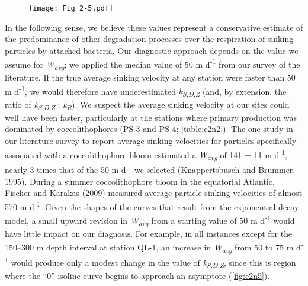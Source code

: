 \begin{figure}[!p]
\texttt{[image: Fig\_2-5.pdf]}
\end{figure}

In the following sense, we believe these values represent a conservative estimate of the predominance of other degradation processes over the respiration of sinking particles by attached bacteria. Our diagnostic approach depends on the value we assume for \emph{W\textsubscript{avg}}; we applied the median value of 50 m d\textsuperscript{-1} from our survey of the literature. If the true average sinking velocity at any station were faster than 50 m d\textsuperscript{-1}, we would therefore have underestimated \emph{k\textsubscript{S}}\textsubscript{,\emph{D},\emph{Z}} (and, by extension, the ratio of \emph{k\textsubscript{S}}\textsubscript{,\emph{D},\emph{Z}} : \emph{k\textsubscript{R}}). We suspect the average sinking velocity at our sites could well have been faster, particularly at the stations where primary production was dominated by coccolithophores (PS-3 and PS-4; \autoref{table:c2n2}). The one study in our literature survey to report average sinking velocities for particles specifically associated with a coccolithophore bloom estimated a \emph{W\textsubscript{avg}} of 141 $\pm$ 11 m d\textsuperscript{-1}, nearly 3 times that of the 50 m d\textsuperscript{-1} we selected (Knappertsbusch and Brummer, 1995). During a summer coccolithophore bloom in the equatorial Atlantic, Fischer and Karakas (2009) measured average particle sinking velocities of almost 570 m d\textsuperscript{-1}. Given the shapes of the curves that result from the exponential decay model, a small upward revision in \emph{W\textsubscript{avg}} from a starting value of 50 m d\textsuperscript{-1} would have little impact on our diagnosis. For example, in all instances except for the 150--300 m depth interval at station QL-1, an increase in \emph{W\textsubscript{avg}} from 50 to 75 m d\textsuperscript{-1} would produce only a modest change in the value of \emph{k\textsubscript{S}}\textsubscript{,\emph{D},\emph{Z}}, since this is region where the ``0'' isoline curve begins to approach an asymptote (\autoref{fig:c2n5}).
